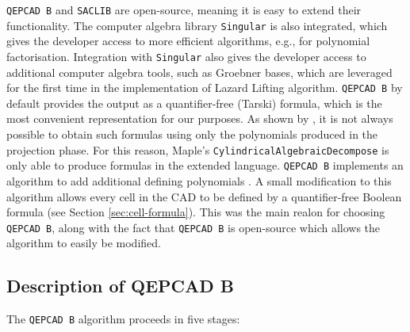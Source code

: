 \documentclass[
]{book}
\theoremstyle{definition}
\theoremstyle{definition}
\theoremstyle{definition}
\theoremstyle{definition}
\theoremstyle{remark}
\begin{document}
\texttt{QEPCAD\ B} and \texttt{SACLIB} are open-source, meaning it is easy to extend their functionality. The computer algebra library
\texttt{Singular} is also integrated, which gives the developer access to more efficient algorithms, e.g., for polynomial factorisation. Integration with \texttt{Singular} also gives the developer access to additional computer algebra tools, such as Groebner bases, which are leveraged for the first time in the implementation of Lazard Lifting algorithm.
\texttt{QEPCAD\ B} by default provides the output as a
quantifier-free (Tarski) formula, which is the most convenient representation for our purposes. As shown by \citet{collins1975}, it is not always possible to obtain such formulas using only the polynomials produced in the projection phase.
For this reason, Maple's \texttt{CylindricalAlgebraicDecompose} is only able to produce formulas in the extended language. \texttt{QEPCAD\ B} implements an algorithm to add additional defining polynomials \citep{brown99}. A small modification to this algorithm allows every cell in the CAD to be defined by a quantifier-free Boolean formula (see Section \ref{sec:cell-formula}).
This was the main realon for choosing \texttt{QEPCAD\ B}, along with the fact that \texttt{QEPCAD\ B} is open-source which allows the algorithm to easily be modified.

\hypertarget{sec:qepcad}{%
\subsection{Description of QEPCAD B}\label{sec:qepcad}}

The \texttt{QEPCAD\ B} algorithm proceeds in five stages:
\end{document}
